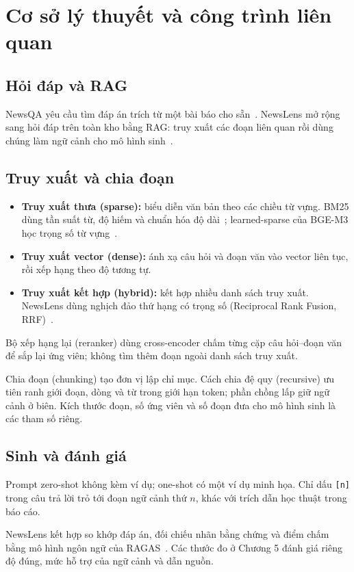 \section{Cơ sở lý thuyết và công trình liên quan}
\subsection{Hỏi đáp và RAG}
NewsQA yêu cầu tìm đáp án trích từ một bài báo cho sẵn~\cite{newsqa}. NewsLens mở rộng sang hỏi đáp trên toàn kho bằng RAG: truy xuất các đoạn liên quan rồi dùng chúng làm ngữ cảnh cho mô hình sinh~\cite{rag}.
\subsection{Truy xuất và chia đoạn}
\begin{itemize}
\item \textbf{Truy xuất thưa (sparse):} biểu diễn văn bản theo các chiều từ vựng. BM25 dùng tần suất từ, độ hiếm và chuẩn hóa độ dài~\cite{bm25}; learned-sparse của BGE-M3 học trọng số từ vựng~\cite{bge}.
\item \textbf{Truy xuất vector (dense):} ánh xạ câu hỏi và đoạn văn vào vector liên tục, rồi xếp hạng theo độ tương tự.
\item \textbf{Truy xuất kết hợp (hybrid):} kết hợp nhiều danh sách truy xuất. NewsLens dùng nghịch đảo thứ hạng có trọng số (Reciprocal Rank Fusion, RRF)~\cite{rrf}.
\end{itemize}
Bộ xếp hạng lại (reranker) dùng cross-encoder chấm từng cặp câu hỏi--đoạn văn để sắp lại ứng viên; không tìm thêm đoạn ngoài danh sách truy xuất.

Chia đoạn (chunking) tạo đơn vị lập chỉ mục. Cách chia đệ quy (recursive) ưu tiên ranh giới đoạn, dòng và từ trong giới hạn token; phần chồng lấp giữ ngữ cảnh ở biên. Kích thước đoạn, số ứng viên và số đoạn đưa cho mô hình sinh là các tham số riêng.
\subsection{Sinh và đánh giá}
Prompt zero-shot không kèm ví dụ; one-shot có một ví dụ minh họa. Chỉ dấu \texttt{[n]} trong câu trả lời trỏ tới đoạn ngữ cảnh thứ $n$, khác với trích dẫn học thuật trong báo cáo.

NewsLens kết hợp so khớp đáp án, đối chiếu nhãn bằng chứng và điểm chấm bằng mô hình ngôn ngữ của RAGAS~\cite{ragas}. Các thước đo ở Chương 5 đánh giá riêng độ đúng, mức hỗ trợ của ngữ cảnh và dẫn nguồn.
